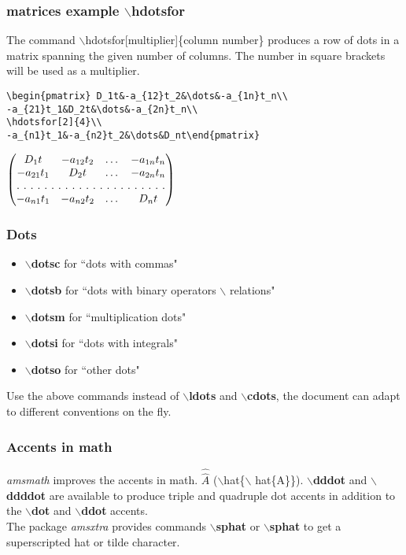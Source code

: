 \documentclass[12pt]{beamer}
\begin{document}
\begin{frame}[fragile]
\frametitle{matrices example $\backslash$hdotsfor}
    The command $\backslash$hdotsfor[multiplier]\{column number\} produces a row of dots in a matrix spanning the given number of columns. The number in square brackets will be used as a multiplier. \\
    {\tiny{\begin{verbatim}
\begin{pmatrix} D_1t&-a_{12}t_2&\dots&-a_{1n}t_n\\
-a_{21}t_1&D_2t&\dots&-a_{2n}t_n\\
\hdotsfor[2]{4}\\
-a_{n1}t_1&-a_{n2}t_2&\dots&D_nt\end{pmatrix}
    \end{verbatim}}}
    $\begin{pmatrix} D_1t&-a_{12}t_2&\dots&-a_{1n}t_n\\
        -a_{21}t_1&D_2t&\dots&-a_{2n}t_n\\
        \hdotsfor[2]{4}\\
        -a_{n1}t_1&-a_{n2}t_2&\dots&D_nt
    \end{pmatrix}$
\end{frame}

\begin{frame}[fragile]
\frametitle{Dots}
    \begin{itemize}
      \item \textbf{$\backslash$dotsc} for ``dots with commas"
      \item \textbf{$\backslash$dotsb} for ``dots with binary operators $\backslash$ relations"
      \item \textbf{$\backslash$dotsm} for ``multiplication dots"
      \item \textbf{$\backslash$dotsi} for ``dots with integrals"
      \item \textbf{$\backslash$dotso} for ``other dots"
    \end{itemize}
    Use the above commands instead of $\backslash$\textbf{ldots} and $\backslash$\textbf{cdots}, the document can adapt to different conventions on the fly.
\end{frame}

\begin{frame}[fragile]
\frametitle{Accents in math}
   \emph{amsmath} improves the accents in math. $\hat{\hat{A}}$ ($\backslash$hat\{$\backslash$ hat\{A\}\}). $\backslash$\textbf{dddot} and $\backslash$\textbf{ddddot} are available to produce triple and quadruple dot accents in addition to the $\backslash$\textbf{dot} and $\backslash$\textbf{ddot} accents.\\
   The package \emph{amsxtra} provides commands $\backslash$\textbf{sphat} or $\backslash$\textbf{sphat} to get a superscripted hat or tilde character.
\end{frame}
\end{document}
